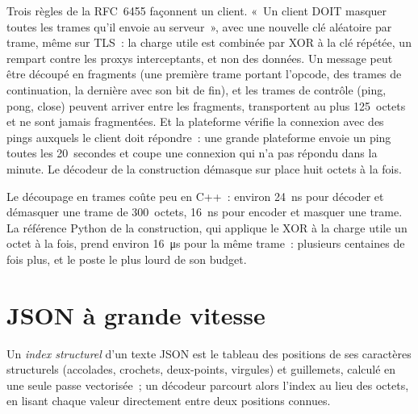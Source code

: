 Trois règles de la RFC~6455 façonnent un client. «~Un client DOIT masquer toutes les trames qu'il envoie au serveur~», avec une nouvelle clé aléatoire
par trame, même sur TLS~: la charge utile est combinée par XOR à la clé répétée, un rempart contre les proxys interceptants, et non des données. Un
message peut être découpé en fragments (une première trame portant l'opcode, des trames de continuation, la dernière avec son bit de fin), et
les trames de contrôle (ping, pong, close) peuvent arriver entre les fragments, transportent au plus 125~octets et ne sont jamais fragmentées. Et la
plateforme vérifie la connexion avec des pings auxquels le client doit répondre~: une grande plateforme envoie un ping toutes les 20~secondes et coupe
une connexion qui n'a pas répondu dans la minute. Le décodeur de la construction démasque sur place huit octets à la fois.

\label{lst:ll:websocket-rest-tls-and-json-at-speed:unmask}

Le découpage en trames coûte peu en C++~: environ \qty{24}{\nano\second} pour décoder et démasquer une trame de 300~octets, \qty{16}{\nano\second} pour
encoder et masquer une trame. La référence Python de la construction, qui applique le XOR à la charge utile un octet à la fois, prend environ
\qty{16}{\micro\second} pour la même trame~: plusieurs centaines de fois plus, et le poste le plus lourd de son budget.

\section{JSON à grande vitesse}

\begin{definition}\label{def:ll:websocket-rest-tls-and-json-at-speed:index}
Un \emph{index structurel} d'un texte JSON est le tableau des positions de ses caractères structurels (accolades, crochets,
deux-points, virgules) et guillemets, calculé en une seule passe vectorisée~; un décodeur parcourt alors l'index au lieu des octets, en lisant chaque
valeur directement entre deux positions connues.
\end{definition}

